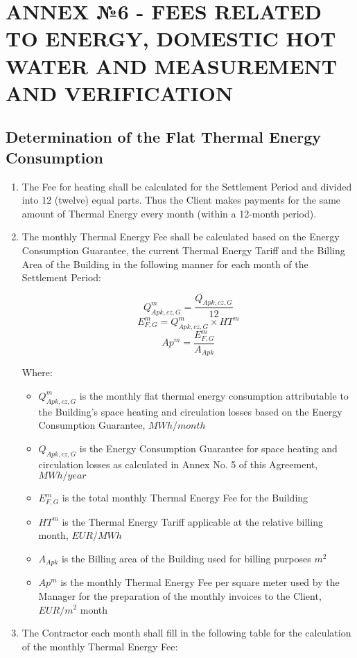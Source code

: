 \section{ANNEX №6 {-} FEES RELATED TO ENERGY, DOMESTIC HOT WATER AND MEASUREMENT AND VERIFICATION}

\subsection{Determination of the Flat Thermal Energy Consumption}
\begin{enumerate}
	\item The Fee for heating shall be calculated for the Settlement Period and divided into 12 (twelve) equal parts. Thus the Client makes payments for the same amount of Thermal Energy every month (within a 12-month period).
	\item The monthly Thermal Energy Fee shall be calculated based on the Energy Consumption Guarantee, the current Thermal Energy Tariff and the Billing Area of the Building in the following manner for each month of the Settlement Period:

\[ Q^{m}_{Apk,cz,G} = \frac{Q_{Apk,cz,G}}{12} \]
\[ E^{m}_{F,G} = Q^{m}_{Apk,cz,G} \times HT^m \]
\[ Ap^m = \frac{E^{m}_{F,G}}{A_{Apk}} \]

Where:

\begin{itemize}
	\item $Q^{m}_{Apk,cz,G}$ is the monthly flat thermal energy consumption attributable to the Building’s space heating and circulation losses based on the Energy Consumption Guarantee, $MWh/month$
	\item $Q_{Apk,cz,G}$ is the Energy Consumption Guarantee for space heating and circulation losses as calculated in Annex No. 5 of this Agreement, $MWh/year$
	\item $E^{m}_{F,G}$ is the total monthly Thermal Energy Fee for the Building
	\item $HT^m$ is the Thermal Energy Tariff applicable at the relative billing month, $EUR/MWh$
	\item $A_{Apk}$ is the Billing area of the Building used for billing purposes $m^2$
	\item $Ap^m$ is the monthly Thermal Energy Fee per square meter used by the Manager for the preparation of the monthly invoices to the Client, $EUR/m^2$ month
\end{itemize}

	\item The Contractor each month shall fill in the following table for the calculation of the monthly Thermal Energy Fee:


\end{enumerate}
